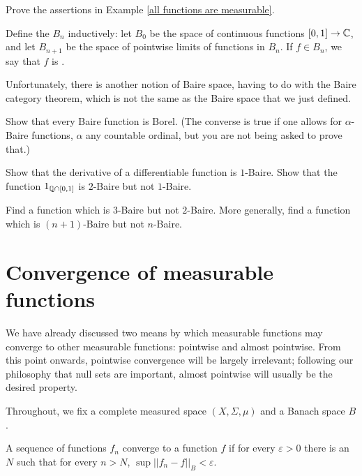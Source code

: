 \begin{exercise}
\label{all functions are measurable exer}
Prove the assertions in Example \ref{all functions are measurable}.
\end{exercise}

\begin{definition}
Define the  $B_{n}$ inductively: let $B_0$ be the space of continuous functions $[0, 1] \to \mathbb{C}$, and let $B_{n+1}$ be the space of pointwise limits of functions in $B_{n}$.
If $f \in B_{n}$, we say that $f$ is .

Unfortunately, there is another notion of Baire space, having to do with the Baire category theorem, which is not the same as the Baire space that we just defined.
\end{definition}

\begin{exercise}
Show that every Baire function is Borel.
(The converse is true if one allows for $\alpha$-Baire functions, $\alpha$ any countable ordinal, but you are not being asked to prove that.)
\end{exercise}

\begin{exercise}
Show that the derivative of a differentiable function is $1$-Baire.
Show that the function $1_{\mathbb{Q} \cap [0, 1]}$ is $2$-Baire but not $1$-Baire.
\end{exercise}

\begin{exercise}
Find a function which is $3$-Baire but not $2$-Baire. More generally, find a function which is $(n+1)$-Baire but not $n$-Baire.
\end{exercise}

\section{Convergence of measurable functions}
We have already discussed two means by which measurable functions may converge to other measurable functions: pointwise and almost pointwise.
From this point onwards, pointwise convergence will be largely irrelevant; following our philosophy that null sets are important, almost pointwise will usually be the desired property.

\begin{subsec}
Throughout, we fix a complete measured space $(X, \Sigma, \mu)$ and a Banach space $B$.
\end{subsec}

\begin{definition}
A sequence of functions $f_{n}$ converge to a function $f$  if for every $\varepsilon > 0$ there is an $N$ such that for every $n > N$, $\sup ||f_{n} - f||_{B} < \varepsilon$.
\end{definition}

